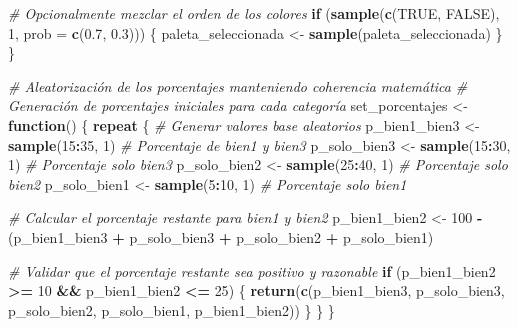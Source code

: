 \documentclass[
]{article}
\newenvironment{Shaded}{\begin{snugshade}}{\end{snugshade}}
\newcommand{\AttributeTok}[1]{\textcolor[rgb]{0.13,0.29,0.53}{#1}}
\newcommand{\CommentTok}[1]{\textcolor[rgb]{0.56,0.35,0.01}{\textit{#1}}}
\newcommand{\ConstantTok}[1]{\textcolor[rgb]{0.56,0.35,0.01}{#1}}
\newcommand{\ControlFlowTok}[1]{\textcolor[rgb]{0.13,0.29,0.53}{\textbf{#1}}}
\newcommand{\DecValTok}[1]{\textcolor[rgb]{0.00,0.00,0.81}{#1}}
\newcommand{\FloatTok}[1]{\textcolor[rgb]{0.00,0.00,0.81}{#1}}
\newcommand{\FunctionTok}[1]{\textcolor[rgb]{0.13,0.29,0.53}{\textbf{#1}}}
\newcommand{\NormalTok}[1]{#1}
\newcommand{\OtherTok}[1]{\textcolor[rgb]{0.56,0.35,0.01}{#1}}
\newcommand{\SpecialCharTok}[1]{\textcolor[rgb]{0.81,0.36,0.00}{\textbf{#1}}}
\begin{document}
\begin{Shaded}
\begin{Highlighting}[]
  \CommentTok{\# Opcionalmente mezclar el orden de los colores}
  \ControlFlowTok{if}\NormalTok{ (}\FunctionTok{sample}\NormalTok{(}\FunctionTok{c}\NormalTok{(}\ConstantTok{TRUE}\NormalTok{, }\ConstantTok{FALSE}\NormalTok{), }\DecValTok{1}\NormalTok{, }\AttributeTok{prob =} \FunctionTok{c}\NormalTok{(}\FloatTok{0.7}\NormalTok{, }\FloatTok{0.3}\NormalTok{))) \{}
\NormalTok{    paleta\_seleccionada }\OtherTok{\textless{}{-}} \FunctionTok{sample}\NormalTok{(paleta\_seleccionada)}
\NormalTok{  \}}
\NormalTok{\}}

\CommentTok{\# Aleatorización de los porcentajes manteniendo coherencia matemática}
\CommentTok{\# Generación de porcentajes iniciales para cada categoría}
\NormalTok{set\_porcentajes }\OtherTok{\textless{}{-}} \ControlFlowTok{function}\NormalTok{() \{}
  \ControlFlowTok{repeat}\NormalTok{ \{}
    \CommentTok{\# Generar valores base aleatorios}
\NormalTok{    p\_bien1\_bien3 }\OtherTok{\textless{}{-}} \FunctionTok{sample}\NormalTok{(}\DecValTok{15}\SpecialCharTok{:}\DecValTok{35}\NormalTok{, }\DecValTok{1}\NormalTok{)  }\CommentTok{\# Porcentaje de bien1 y bien3}
\NormalTok{    p\_solo\_bien3 }\OtherTok{\textless{}{-}} \FunctionTok{sample}\NormalTok{(}\DecValTok{15}\SpecialCharTok{:}\DecValTok{30}\NormalTok{, }\DecValTok{1}\NormalTok{)   }\CommentTok{\# Porcentaje solo bien3}
\NormalTok{    p\_solo\_bien2 }\OtherTok{\textless{}{-}} \FunctionTok{sample}\NormalTok{(}\DecValTok{25}\SpecialCharTok{:}\DecValTok{40}\NormalTok{, }\DecValTok{1}\NormalTok{)   }\CommentTok{\# Porcentaje solo bien2}
\NormalTok{    p\_solo\_bien1 }\OtherTok{\textless{}{-}} \FunctionTok{sample}\NormalTok{(}\DecValTok{5}\SpecialCharTok{:}\DecValTok{10}\NormalTok{, }\DecValTok{1}\NormalTok{)    }\CommentTok{\# Porcentaje solo bien1}

    \CommentTok{\# Calcular el porcentaje restante para bien1 y bien2}
\NormalTok{    p\_bien1\_bien2 }\OtherTok{\textless{}{-}} \DecValTok{100} \SpecialCharTok{{-}}\NormalTok{ (p\_bien1\_bien3 }\SpecialCharTok{+}\NormalTok{ p\_solo\_bien3 }\SpecialCharTok{+}\NormalTok{ p\_solo\_bien2 }\SpecialCharTok{+}\NormalTok{ p\_solo\_bien1)}

    \CommentTok{\# Validar que el porcentaje restante sea positivo y razonable}
    \ControlFlowTok{if}\NormalTok{ (p\_bien1\_bien2 }\SpecialCharTok{\textgreater{}=} \DecValTok{10} \SpecialCharTok{\&\&}\NormalTok{ p\_bien1\_bien2 }\SpecialCharTok{\textless{}=} \DecValTok{25}\NormalTok{) \{}
      \FunctionTok{return}\NormalTok{(}\FunctionTok{c}\NormalTok{(p\_bien1\_bien3, p\_solo\_bien3, p\_solo\_bien2, p\_solo\_bien1, p\_bien1\_bien2))}
\NormalTok{    \}}
\NormalTok{  \}}
\NormalTok{\}}


\end{Highlighting}
\end{Shaded}
\end{document}
